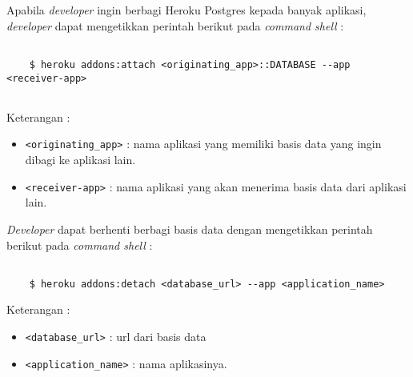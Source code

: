 Apabila \textit{developer} ingin berbagi Heroku Postgres kepada banyak aplikasi, \textit{developer} dapat mengetikkan perintah berikut pada \textit{command shell} : 
\begin{lstlisting}

	$ heroku addons:attach <originating_app>::DATABASE --app <receiver-app>
	
\end{lstlisting}
Keterangan :
\begin{itemize}
\item \texttt{<originating\_app>} : nama aplikasi yang memiliki basis data yang ingin dibagi ke aplikasi lain. 
\item \texttt{<receiver-app>} : nama aplikasi yang akan menerima basis data dari aplikasi lain.
\end{itemize}

\textit{Developer} dapat berhenti berbagi basis data dengan mengetikkan perintah berikut pada \textit{command shell} :
\begin{lstlisting}

	$ heroku addons:detach <database_url> --app <application_name>

\end{lstlisting}
Keterangan :
\begin{itemize}
\item \texttt{<database\_url>} : url dari basis data
\item \texttt{<application\_name>} : nama aplikasinya.
\end{itemize}

